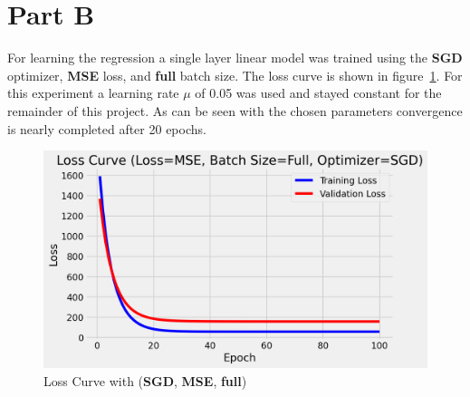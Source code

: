 \newpage
\section{Part B}
\label{sec:sec_b}
For learning the regression a single layer linear model was trained using the \textbf{SGD} optimizer, \textbf{MSE} loss, and \textbf{full} batch size. The loss curve is shown in figure~\ref{fig:b loss}. 
For this experiment a learning rate $\mu$ of 0.05 was used and stayed constant for the remainder of this project. As can be seen with the chosen parameters convergence is nearly completed after 20 epochs.

\begin{figure}[htpb]
	\centering
	\includegraphics[width=\columnwidth]{figures/b_loss.png}
	\caption{Loss Curve with (\textbf{SGD}, \textbf{MSE}, \textbf{full})}
	\label{fig:b loss}
\end{figure}

